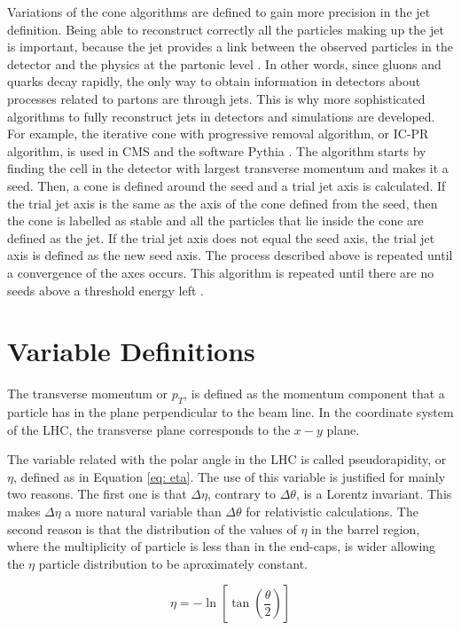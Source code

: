 Variations of the cone algorithms are defined to gain more precision in the jet definition. Being able to reconstruct correctly all the particles making up the jet is important, because the jet provides a link between the observed particles in the detector and the physics at the partonic level \cite{Jets}. In other words, since gluons and quarks decay rapidly, the only way to obtain information in detectors about processes related to partons are through jets. This is why more sophisticated algorithms to fully reconstruct jets in detectors and simulations are developed. For example, the iterative cone with progressive removal algorithm, or IC-PR algorithm, is used in CMS and the software Pythia \cite{Jets}. The algorithm starts by finding the cell in the detector with largest transverse momentum and makes it a seed. Then, a cone is defined around the seed and a trial jet axis is calculated. If the trial jet axis is the same as the axis of the cone defined from the seed, then the cone is labelled as stable and all the particles that lie inside the cone are defined as the jet. If the trial jet axis does not equal the seed axis, the trial jet axis is defined as the new seed axis. The process described above is repeated until a convergence of the axes occurs. This algorithm is repeated until there are no seeds above a threshold energy left \cite{Jets}.  


\section{Variable Definitions}

The transverse momentum or $p_{T}$, is defined as the momentum component that a particle has in the plane perpendicular to the beam line. In the coordinate system of the LHC, the transverse plane corresponds to the $x-y$ plane.

The variable related with the polar angle in the LHC is called pseudorapidity, or $\eta$, defined as in Equation \ref{eq: eta}. The use of this variable is justified for mainly two reasons. The first one is that $\Delta \eta$, contrary to $\Delta \theta$, is a Lorentz invariant. This makes $\Delta \eta$ a more natural variable than $\Delta \theta$ for relativistic calculations. The second reason is that the distribution of the values of $\eta$ in the barrel region, where the multiplicity of particle is less than in the end-caps, is wider allowing the $\eta$ particle distribution to be aproximately constant.

\begin{equation}
 \eta = -\ln\left[\tan\left(\frac{\theta}{2}\right)\right]
 \label{eq: eta}
\end{equation}

